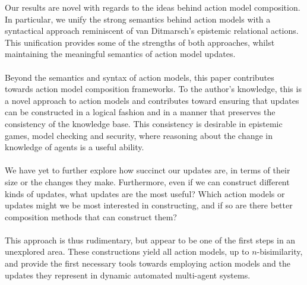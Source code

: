 Our results are novel with regards to the ideas behind action model composition.
In particular, we unify the strong semantics behind action models with a syntactical approach reminiscent of van
Ditmarsch's \cite{ditmarsch2002dga} epistemic relational actions.
This unification provides some of the strengths of both approaches, whilst maintaining the
meaningful semantics of action model updates.\\
\\
Beyond the semantics and syntax of action models, this paper contributes towards action model
composition frameworks.
To the author's knowledge, this is a novel approach to action models and contributes toward ensuring
that updates can be constructed in a logical fashion and in a manner that preserves the consistency
of the knowledge base.
This consistency is desirable in epistemic games, model checking and security, where reasoning about
the change in knowledge of agents is a useful ability.\\
\\
We have yet to further explore how succinct our updates are, in terms of their size or the changes
they make.
Furthermore, even if we can construct different kinds of updates, what updates are the most useful?
Which action models or updates might we be most interested in constructing, and if so are there
better composition methods that can construct them?\\
\\
This approach is thus rudimentary, but appear to be one of the first steps in an unexplored area.
These constructions yield all action models, up to $n$-bisimilarity, and provide the first necessary
tools towards employing action models and the updates they represent in dynamic automated
multi-agent systems.
% 
% 
% 
